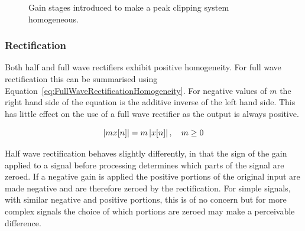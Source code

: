 			\begin{figure}[h!]
				\centering
				\caption{Gain stages introduced to make a peak clipping system homogeneous.}
				\label{fig:HomogeneousClipping}
			\end{figure}

		\subsubsection*{Rectification}
			Both half and full wave rectifiers exhibit positive homogeneity. For full wave rectification this
			can be summarised using Equation~\ref{eq:FullWaveRectificationHomogeneity}. For negative values of
			$m$ the right hand side of the equation is the additive inverse of the left hand side. This has
			little effect on the use of a full wave rectifier as the output is always positive.

			\begin{equation}
				\left|mx[n]\right| = m\left|x[n]\right|, \quad m \geq 0
				\label{eq:FullWaveRectificationHomogeneity}
			\end{equation}

			Half wave rectification behaves slightly differently, in that the sign of the gain applied to a
			signal before processing determines which parts of the signal are zeroed. If a negative gain is
			applied the positive portions of the original input are made negative and are therefore zeroed by
			the rectification. For simple signals, with similar negative and positive portions, this is of no
			concern but for more complex signals the choice of which portions are zeroed may make a perceivable
			difference.

